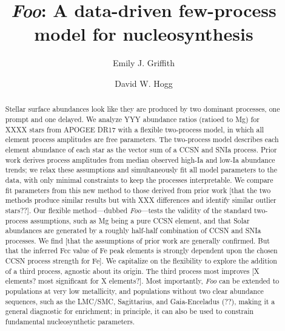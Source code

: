 \documentclass[modern]{aastex631}
\newcommand{\name}{\textsl{Foo}} %
\begin{document}
\title{\name: A data-driven few-process model for nucleosynthesis}


\author[0000-0001-9345-9977]{Emily J. Griffith}

\author[0000-0003-2866-9403]{David W. Hogg}


\begin{abstract}\noindent %
Stellar surface abundances look like they are produced by two dominant processes, one prompt and one delayed.
We analyze YYY abundance ratios (ratioed to Mg) for XXXX stars from APOGEE DR17 with a flexible two-process model, in which all element process amplitudes are free parameters.
The two-process model describes each element abundance of each star as the vector sum of a CCSN and SNIa process.
Prior work derives process amplitudes from median observed high-Ia and low-Ia abundance trends; we relax these assumptions and simultaneously fit all model parameters to the data, with only minimal constraints to keep the processes interpretable.
We compare fit parameters from this new method to those derived from prior work [that the two methods produce similar results but with XXX differences and identify similar outlier stars??].
Our flexible method---dubbed \name---tests the validity of the standard two-process assumptions, such as Mg being a pure CCSN element, and that Solar abundances are generated by a roughly half-half combination of CCSN and SNIa processes.
We find [that the assumptions of prior work are generally confirmed. But that the inferred Fcc value of Fe peak elements is strongly dependent upon the chosen CCSN process strength for Fe].
We capitalize on the flexibility to explore the addition of a third process, agnostic about its origin.
The third process most improves [X elements? most significant for X elements?].
Most importantly, \name{} can be extended to populations at very low metallicity, and populations without two clear abundance sequences, such as the LMC/SMC, Sagittarius, and Gaia-Enceladus (??), making it a general diagnostic for enrichment; in principle, it can also be used to constrain fundamental nucleosynthetic parameters.
\end{abstract}
\end{document}
